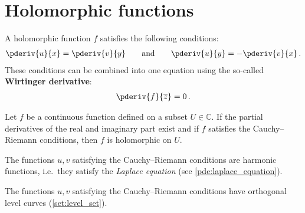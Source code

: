 \section{Holomorphic functions}


    \begin{property}\label{complex:cauchy_riemann}
        A holomorphic function $f$ satisfies the following conditions:
        \begin{gather}
            \pderiv{u}{x} = \pderiv{v}{y} \text{\qquad and\qquad} \pderiv{u}{y} = -\pderiv{v}{x}\,.
        \end{gather}
        These conditions can be combined into one equation using the so-called \textbf{Wirtinger derivative}:
        \begin{gather}
            \label{complex:holomorphic_alternative_condition}
            \pderiv{f}{\overline{z}} = 0\,.
        \end{gather}
    \end{property}

    \begin{theorem}
        Let $f$ be a continuous function defined on a subset $U\in\mathbb{C}$. If the partial derivatives of the real and imaginary part exist and if $f$ satisfies the Cauchy--Riemann conditions, then $f$ is holomorphic on $U$.
    \end{theorem}

    \begin{property}
        The functions $u,v$ satisfying the Cauchy--Riemann conditions are harmonic functions, i.e.~they satisfy the \textit{Laplace equation} (see \cref{pde:laplace_equation}).
    \end{property}
    \begin{property}
        The functions $u,v$ satisfying the Cauchy--Riemann conditions have orthogonal level curves (\cref{set:level_set}).
    \end{property}

